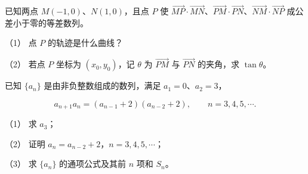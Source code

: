 \begin{question}
已知两点 $M(-1,0)\text{、}N(1,0)$，且点 $P$ 使 $\overrightarrow{MP}\cdot\overrightarrow{MN}$、$\overrightarrow{PM}\cdot\overrightarrow{PN}$、$\overrightarrow{NM}\cdot\overrightarrow{NP}$ 成公差小于零的等差数列。

（1） 点 $P$ 的轨迹是什么曲线？

（2） 若点 $P$ 坐标为 $(x_0,y_0)$，记 $\theta$ 为 $\overrightarrow{PM}$ 与 $\overrightarrow{PN}$ 的夹角，求 $\tan\theta$。

\end{question}
\begin{question}
已知 $\{a_n\}$ 是由非负整数组成的数列，满足 $a_1=0\text{、}a_2=3$，

\nopagebreak[4]
\[
a_{n+1}a_n=(a_{n-1}+2)(a_{n-2}+2),\qquad n=3,4,5,\cdots.
\]

（1） 求 $a_3$；

（2） 证明 $a_n=a_{n-2}+2$，$n=3,4,5,\cdots$；

（3） 求 $\{a_n\}$ 的通项公式及其前 $n$ 项和 $S_n$。

\end{question}